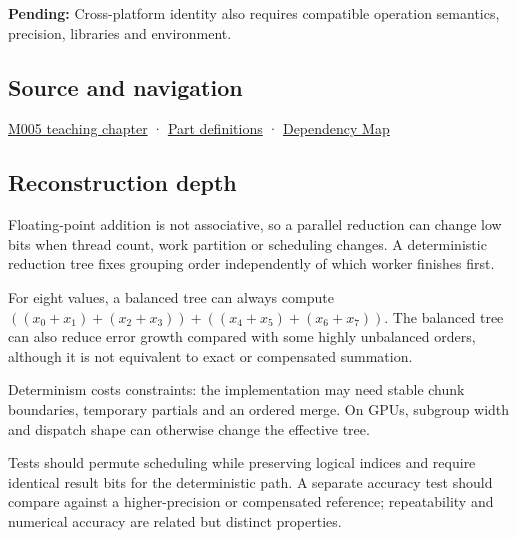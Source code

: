 \textbf{Pending:} Cross-platform identity also requires compatible operation semantics, precision, libraries and environment.

\subsection{Source and navigation}\label{appendix-4c8e0238e7ee-source-and-navigation}

\hyperref[01-foundations-i-ch001-when-arithmetic-meets-uncertainty]{M005 teaching chapter} · \hyperref[appendix-fd090d982a15-m005---parts-77-88]{Part definitions} · \hyperref[appendix-4ad47bdd269a]{Dependency Map}

\subsection{Reconstruction depth}\label{appendix-4c8e0238e7ee-reconstruction-depth}

Floating-point addition is not associative, so a parallel reduction can change low bits when thread count, work partition or scheduling changes. A deterministic reduction tree fixes grouping order independently of which worker finishes first.

For eight values, a balanced tree can always compute \(((x_0+x_1)+(x_2+x_3)) + ((x_4+x_5)+(x_6+x_7))\). The balanced tree can also reduce error growth compared with some highly unbalanced orders, although it is not equivalent to exact or compensated summation.

Determinism costs constraints: the implementation may need stable chunk boundaries, temporary partials and an ordered merge. On GPUs, subgroup width and dispatch shape can otherwise change the effective tree.

Tests should permute scheduling while preserving logical indices and require identical result bits for the deterministic path. A separate accuracy test should compare against a higher-precision or compensated reference; repeatability and numerical accuracy are related but distinct properties.
